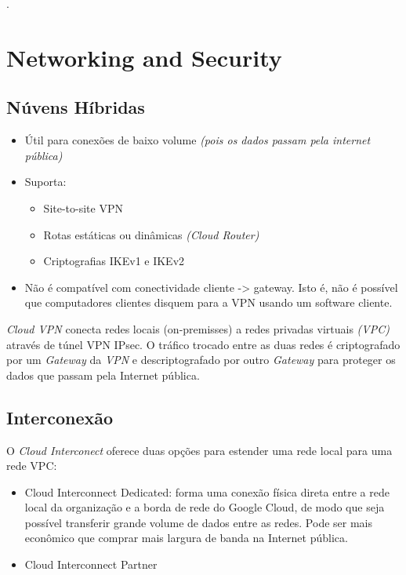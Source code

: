 \documentclass[
]{book}
\providecommand{\tightlist}{%
  \setlength{\itemsep}{0pt}\setlength{\parskip}{0pt}}
\begin{document}
.

\hypertarget{networking-and-security}{%
\chapter{Networking and Security}\label{networking-and-security}}

\hypertarget{nuxfavens-huxedbridas}{%
\section{Núvens Híbridas}\label{nuxfavens-huxedbridas}}

\begin{itemize}
\tightlist
\item
  Útil para conexões de baixo volume \emph{(pois os dados passam pela internet
  pública)}
\item
  Suporta:

  \begin{itemize}
  \tightlist
  \item
    Site-to-site VPN
  \item
    Rotas estáticas ou dinâmicas \emph{(Cloud Router)}
  \item
    Criptografias IKEv1 e IKEv2
  \end{itemize}
\item
  Não é compatível com conectividade cliente -\textgreater{} gateway. Isto é, não é possível
  que computadores clientes disquem para a VPN usando um software cliente.
\end{itemize}

\emph{Cloud VPN} conecta redes locais (on-premisses) a redes privadas virtuais
\emph{(VPC)} através de túnel VPN IPsec. O tráfico trocado entre as duas redes
é criptografado por um \emph{Gateway} da \emph{VPN} e descriptografado por outro
\emph{Gateway} para proteger os dados que passam pela Internet pública.

\hypertarget{interconexuxe3o}{%
\section{Interconexão}\label{interconexuxe3o}}

O \emph{Cloud Interconect} oferece duas opções para estender uma rede local para uma
rede VPC:

\begin{itemize}
\tightlist
\item
  Cloud Interconnect Dedicated: forma uma conexão física direta entre a rede
  local da organização e a borda de rede do Google Cloud, de modo que seja
  possível transferir grande volume de dados entre as redes. Pode ser mais
  econômico que comprar mais largura de banda na Internet pública.
\item
  Cloud Interconnect Partner
\end{itemize}

  
\end{document}
